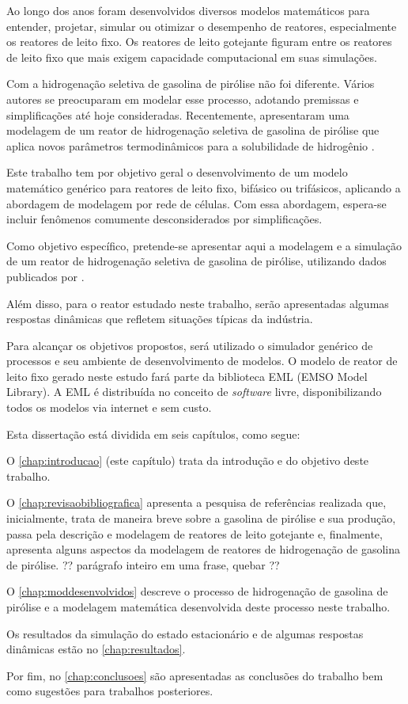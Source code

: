 Ao longo dos anos foram desenvolvidos diversos modelos matemáticos para
entender, projetar, simular ou otimizar o desempenho de reatores, especialmente
os reatores de leito fixo. Os reatores de leito gotejante figuram entre os
reatores de leito fixo que mais exigem capacidade computacional em suas
simulações. 

Com a hidrogenação seletiva de gasolina de pirólise não
foi diferente. Vários autores se preocuparam em modelar esse
processo, adotando premissas e simplificações até hoje consideradas.
Recentemente,  apresentaram uma modelagem de
um reator de hidrogenação seletiva de gasolina de pirólise que aplica novos
parâmetros termodinâmicos para a solubilidade de hidrogênio \cite{Rojas2014}. 

Este trabalho tem por objetivo geral o desenvolvimento de um modelo
matemático genérico para reatores de leito fixo, bifásico ou trifásicos,
aplicando a abordagem de modelagem por rede de células. Com essa
abordagem, espera-se incluir fenômenos comumente desconsiderados por
simplificações.

Como objetivo específico, pretende-se apresentar aqui a modelagem e a
simulação de um reator de hidrogenação seletiva de gasolina de pirólise,
utilizando dados publicados por .

Além disso, para o reator estudado neste trabalho, serão
apresentadas algumas respostas dinâmicas que refletem situações típicas da
indústria.

Para alcançar os objetivos propostos, será utilizado o simulador genérico de
processos \emso{} \cite{Soares2003} e seu ambiente de desenvolvimento de
modelos. O modelo de reator de leito fixo gerado neste estudo fará parte da
biblioteca EML (EMSO Model Library). A EML é distribuída no conceito de
\emph{software} livre, disponibilizando todos os modelos via internet e sem custo.

Esta dissertação está dividida em seis capítulos, como segue:

O \autoref{chap:introducao} (este capítulo) trata da introdução e do objetivo deste trabalho.

O \autoref{chap:revisaobibliografica} apresenta a pesquisa de referências
realizada que, inicialmente, trata de maneira breve sobre a gasolina de pirólise
e sua produção, passa pela descrição e modelagem de reatores de leito
gotejante e, finalmente, apresenta alguns aspectos da modelagem de
reatores de hidrogenação de gasolina de pirólise.
?? parágrafo inteiro em uma frase, quebar ??

O \autoref{chap:moddesenvolvidos} descreve o processo de
hidrogenação de gasolina de pirólise e a modelagem matemática
desenvolvida deste processo neste trabalho.

Os resultados da simulação do estado estacionário e de algumas
respostas dinâmicas estão no \autoref{chap:resultados}.

Por fim, no \autoref{chap:conclusoes} são apresentadas as conclusões do
trabalho bem como sugestões para trabalhos posteriores.
